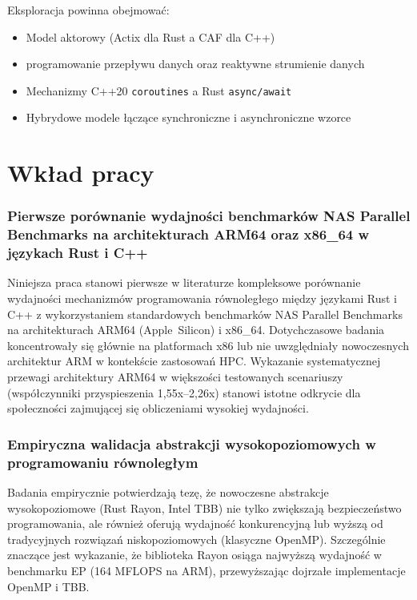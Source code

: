 Eksploracja powinna obejmować:
\begin{itemize}
    \item Model aktorowy (Actix dla Rust a CAF dla C++)
    \item programowanie przepływu danych oraz reaktywne strumienie danych
    \item Mechanizmy C++20 \texttt{coroutines} a Rust \texttt{async/await}
    \item Hybrydowe modele łączące synchroniczne i asynchroniczne wzorce
\end{itemize}


\section{Wkład pracy}

\subsubsection{Pierwsze porównanie wydajności benchmarków NAS Parallel Benchmarks na architekturach ARM64 oraz x86\_64 w językach Rust i C++}

Niniejsza praca stanowi pierwsze w literaturze kompleksowe porównanie wydajności mechanizmów programowania równoległego między językami Rust i C++ z wykorzystaniem standardowych benchmarków NAS Parallel Benchmarks na architekturach ARM64 \mbox{(Apple Silicon)} i x86\_64. Dotychczasowe badania koncentrowały się głównie na platformach x86 lub nie uwzględniały nowoczesnych architektur ARM w kontekście zastosowań HPC. Wykazanie systematycznej przewagi architektury ARM64 w większości testowanych scenariuszy (współczynniki przyspieszenia 1,55x--2,26x) stanowi istotne odkrycie dla społeczności zajmującej się obliczeniami wysokiej wydajności.

\subsubsection{Empiryczna walidacja abstrakcji wysokopoziomowych w programowaniu równoległym}

Badania empirycznie potwierdzają tezę, że nowoczesne abstrakcje wysokopoziomowe (Rust Rayon, Intel TBB) nie tylko zwiększają bezpieczeństwo programowania, ale również oferują wydajność konkurencyjną lub wyższą od tradycyjnych rozwiązań niskopoziomowych (klasyczne OpenMP). Szczególnie znaczące jest wykazanie, że biblioteka Rayon osiąga najwyższą wydajność w benchmarku EP (164 MFLOPS na ARM), przewyższając dojrzałe implementacje OpenMP i TBB.


